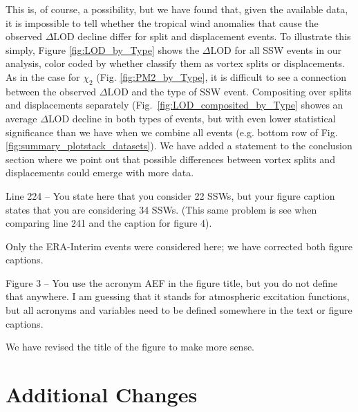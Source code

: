 \documentclass[a4paper,10pt]{article}
\begin{document}
This is, of course, a possibility, but we have found that, given the available data, it is impossible to tell whether the tropical wind anomalies that cause the observed $\Delta$LOD decline differ for split and displacement events.
To illustrate this simply, Figure \ref{fig:LOD_by_Type} shows the $\Delta$LOD  for all SSW events in our analysis, color coded by whether \citet{Charlton2007} classify them as vortex splits or displacements.
As in the case for $\chi_2$ (Fig. \ref{fig:PM2_by_Type}, it is difficult to see a connection between the observed $\Delta$LOD and the type of SSW event.
Compositing over splits and displacements separately (Fig.~\ref{fig:LOD_composited_by_Type} showes an average $\Delta$LOD decline in both types of events, but with even lower statistical significance than we have when we combine all events (e.g. bottom row of Fig. \ref{fig:summary_plotstack_datasets}).
We have added a statement to the conclusion section where we point out that possible differences between vortex splits and displacements could emerge with more data.

\vspace{0.5cm}

\textcolor{reviewer}{Line 224 – You state here that you consider 22 SSWs, but your figure caption states that
you are considering 34 SSWs. (This same problem is see when comparing line 241 and
the caption for figure 4).}
\vspace{0.5cm}

Only the ERA-Interim events were considered here; we have corrected both figure captions.
\vspace{0.5cm}

\textcolor{reviewer}{Figure 3 – You use the acronym AEF in the figure title, but you do not define that
anywhere. I am guessing that it stands for atmospheric excitation functions, but all
acronyms and variables need to be defined somewhere in the text or figure captions.}
\vspace{0.5cm}

We have revised the title of the figure to make more sense.

\section{Additional Changes}
\label{sec:overview}
\end{document}
